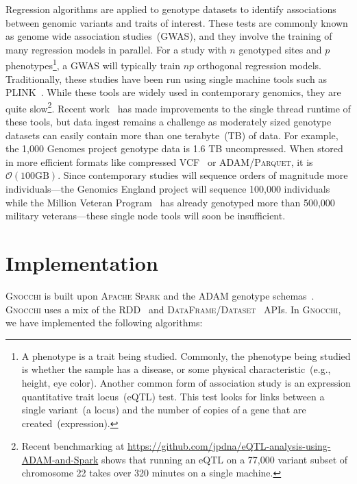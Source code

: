 \documentclass[11pt]{article} %
\begin{document}
Regression algorithms are applied to genotype datasets to identify associations
between genomic variants and traits of interest. These tests are commonly known
as genome wide association studies~(GWAS), and they involve the training of
many regression models in parallel. For a study with $n$ genotyped sites and
$p$ phenotypes\footnote{A phenotype is a trait being studied. Commonly, the
phenotype being studied is whether the sample has a disease, or some physical
characteristic~(e.g., height, eye color). Another common form of association
study is an expression quantitative trait locus~(eQTL) test. This test looks for
links between a single variant~(a locus) and the number of copies of a
gene that are created~(expression).}, a GWAS will typically train $np$
orthogonal regression models. Traditionally, these studies have been run using
single machine tools such as PLINK~\cite{purcell07}. While these tools are
widely used in contemporary genomics, they are quite slow\footnote{Recent
benchmarking at \url{https://github.com/jpdna/eQTL-analysis-using-ADAM-and-Spark}
shows that running an eQTL on a 77,000 variant subset of chromosome 22 takes
over 320 minutes on a single machine.}. Recent work~\cite{chang15} has made
improvements to the single thread runtime of these tools, but data ingest
remains a challenge as moderately sized genotype datasets can easily contain
more than one terabyte~(TB) of data. For example, the 1,000 Genomes project
genotype data is 1.6 TB uncompressed. When stored in more efficient formats like
compressed \textsc{VCF}~\cite{danecek11} or \textsc{ADAM}/\textsc{Parquet}, it is
$\mathcal{O}(100\text{GB})$. Since contemporary studies will sequence orders of
magnitude more individuals---the Genomics England project will sequence 100,000
individuals~\cite{uk100k} while the Million Veteran Program~\cite{mvp} has
already genotyped more than 500,000 military veterans---these single node tools
will soon be insufficient.

\section{Implementation}
\label{sec:implementation}

\textsc{Gnocchi} is built upon \textsc{Apache Spark} and the \textsc{ADAM}
genotype schemas~\cite{nothaft15}. \textsc{Gnocchi} uses a mix of the
\textsc{RDD}~\cite{zaharia12} and
\textsc{DataFrame}/\textsc{Dataset}~\cite{armbrust15} APIs. In \textsc{Gnocchi},
we have implemented the following algorithms:
\end{document}

